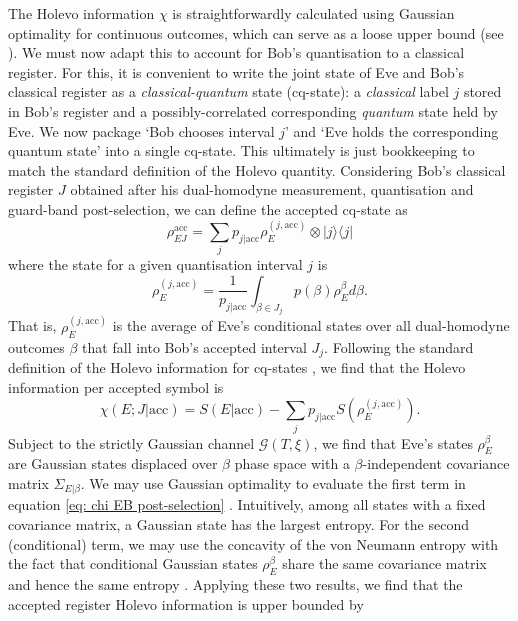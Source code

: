 ﻿\documentclass[12pt]{article}
\begin{document}
The Holevo information $\chi$ is straightforwardly calculated using Gaussian optimality for continuous outcomes, which can serve as a loose upper bound (see ). We must now adapt this to account for Bob's quantisation to a classical register. For this, it is convenient to write the joint state of Eve and Bob's classical register as a \textit{classical-quantum} state (cq-state): a \textit{classical} label $j$ stored in Bob's register and a possibly-correlated corresponding \textit{quantum} state held by Eve. We now package `Bob chooses interval $j$' and `Eve holds the corresponding quantum state' into a single cq-state. This ultimately is just bookkeeping to match the standard definition of the Holevo quantity. Considering Bob's classical register $J$ obtained after his dual-homodyne measurement, quantisation and guard-band post-selection, we can define the accepted cq-state as
\begin{equation}
  \rho_{EJ}^\text{acc} = \sum_j p_{j|\text{acc}} \rho_E^{(j,\text{acc})} \otimes |j\rangle\langle j|
\end{equation}
where the state for a given quantisation interval $j$ is
\begin{equation}
\rho_E^{(j,\text{acc})} = \frac{1}{p_{j|\text{acc}}} \int_{\beta \in J_j} p(\beta) \rho_E^\beta d\beta.
\end{equation}
That is, $\rho_E^{(j,\text{acc})}$ is the average of Eve's conditional states over all dual-homodyne outcomes $\beta$ that fall into Bob's accepted interval $J_j$. Following the standard definition of the Holevo information for cq-states \cite{Watrous-2018}, we find that the Holevo information per accepted symbol is
\begin{equation}
  \label{eq: chi EB post-selection}
  \chi(E;J|\text{acc}) = S(E|\text{acc}) - \sum_j p_{j|\text{acc}} S\left(\rho_E^{(j,\text{acc})}\right).
\end{equation}
Subject to the strictly Gaussian channel $\mathcal{G}(T, \xi)$, we find that Eve's states $\rho_E^\beta$ are Gaussian states displaced over $\beta$ phase space with a $\beta$-independent covariance matrix $\Sigma_{E|\beta}$. We may use Gaussian optimality to evaluate the first term in equation \eqref{eq: chi EB post-selection} \cite{Navascues-2006}. Intuitively, among all states with a fixed covariance matrix, a Gaussian state has the largest entropy. For the second (conditional) term, we may use the concavity of the von Neumann entropy with the fact that conditional Gaussian states $\rho_E^\beta$ share the same covariance matrix and hence the same entropy \cite{Nielsen-2010}. Applying these two results, we find that the accepted register Holevo information is upper bounded by
\end{document}
